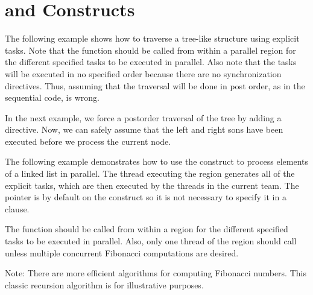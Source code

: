 \pagebreak
\section{ and  Constructs}
\label{sec:task_taskwait}

The following example shows how to traverse a tree-like structure using explicit 
tasks. Note that the  function should be called from within a 
parallel region for the different specified tasks to be executed in parallel. Also 
note that the tasks will be executed in no specified order because there are no 
synchronization directives. Thus, assuming that the traversal will be done in post 
order, as in the sequential code, is wrong.



In the next example, we force a postorder traversal of the tree by adding a  
directive. Now, we can safely assume that the left and right sons have been executed 
before we process the current node.



The following example demonstrates how to use the  construct to process 
elements of a linked list in parallel. The thread executing the  
region generates all of the explicit tasks, which are then executed by the threads 
in the current team. The pointer  is  by default 
on the  construct so it is not necessary to specify it in a  
clause.



The  function should be called from within a   region 
for the different specified tasks to be executed in parallel. Also, only one thread 
of the  region should call  unless multiple concurrent 
Fibonacci computations are desired. 


\clearpage

Note: There are more efficient algorithms for computing Fibonacci numbers. This 
classic recursion algorithm is for illustrative purposes.

